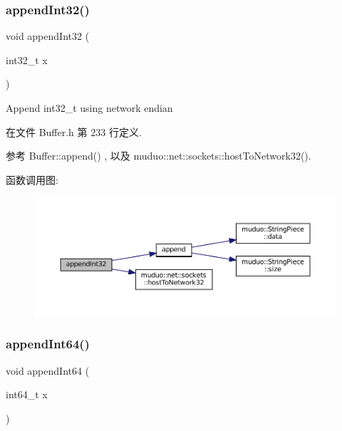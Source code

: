 \subsubsection{\texorpdfstring{append\+Int32()}{appendInt32()}}
{\footnotesize\ttfamily void append\+Int32 (\begin{DoxyParamCaption}\item[{int32\+\_\+t}]{x }\end{DoxyParamCaption})\hspace{0.3cm}{\ttfamily [inline]}}

Append int32\+\_\+t using network endian 

在文件 Buffer.\+h 第 233 行定义.



参考 Buffer\+::append() , 以及 muduo\+::net\+::sockets\+::host\+To\+Network32().

函数调用图\+:
\nopagebreak
\begin{figure}[H]
\begin{center}
\leavevmode
\includegraphics[width=350pt]{classmuduo_1_1net_1_1Buffer_a93760f95378988318124352dbf222e67_cgraph}
\end{center}
\end{figure}
\mbox{\label{classmuduo_1_1net_1_1Buffer_a7e283b380d5c67b86e150324bbb0546a}} 
\subsubsection{\texorpdfstring{append\+Int64()}{appendInt64()}}
{\footnotesize\ttfamily void append\+Int64 (\begin{DoxyParamCaption}\item[{int64\+\_\+t}]{x }\end{DoxyParamCaption})\hspace{0.3cm}{\ttfamily [inline]}}

